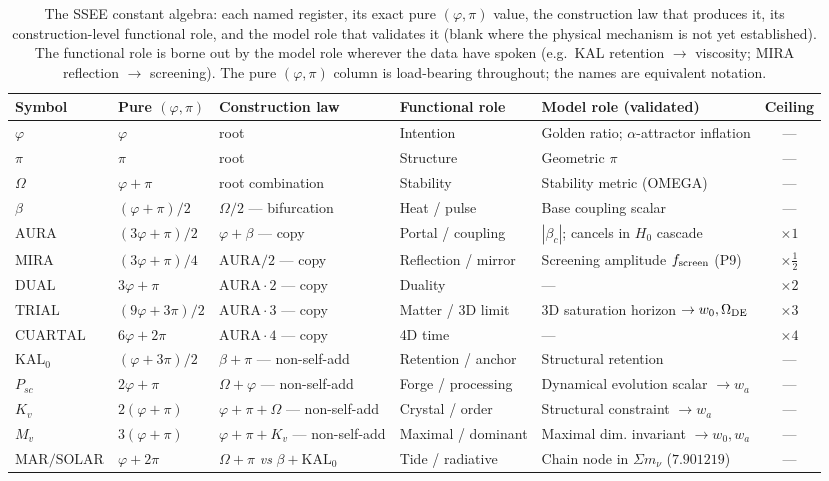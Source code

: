 \documentclass[12pt,a4paper]{article}
\begin{document}
\begin{table}[H]
\centering
\caption{The SSEE constant algebra: each named register, its exact pure
  $(\varphi,\pi)$ value, the construction law that produces it, its
  construction-level functional role, and the model role that validates it
  (blank where the physical mechanism is not yet established). The functional
  role is borne out by the model role wherever the data have spoken
  (e.g.\ KAL retention $\to$ viscosity; MIRA reflection $\to$ screening). The
  pure $(\varphi,\pi)$ column is load-bearing throughout; the names are
  equivalent notation.}
\label{tab:lineage}
\footnotesize
\setlength{\tabcolsep}{4pt}
\renewcommand{\arraystretch}{1.25}
\begin{tabularx}{\textwidth}{l p{1.9cm} p{2.5cm} p{1.9cm} X c}
\toprule
Symbol & Pure $(\varphi,\pi)$ & Construction law & Functional role & Model role (validated) & Ceiling \\
\midrule
$\varphi$ & $\varphi$ & root & Intention & Golden ratio; $\alpha$-attractor inflation & — \\
$\pi$ & $\pi$ & root & Structure & Geometric $\pi$ & — \\
$\Omega$ & $\varphi+\pi$ & root combination & Stability & Stability metric (OMEGA) & — \\
$\beta$ & $(\varphi+\pi)/2$ & $\Omega/2$ — bifurcation & Heat / pulse & Base coupling scalar & — \\
$\mathrm{AURA}$ & $(3\varphi+\pi)/2$ & $\varphi+\beta$ — copy & Portal / coupling & $|\beta_c|$; cancels in $H_0$ cascade & $\times1$ \\
$\mathrm{MIRA}$ & $(3\varphi+\pi)/4$ & $\mathrm{AURA}/2$ — copy & Reflection / mirror & Screening amplitude $f_{\rm screen}$ (P9) & $\times\tfrac12$ \\
$\mathrm{DUAL}$ & $3\varphi+\pi$ & $\mathrm{AURA}\cdot2$ — copy & Duality & — & $\times2$ \\
$\mathrm{TRIAL}$ & $(9\varphi+3\pi)/2$ & $\mathrm{AURA}\cdot3$ — copy & Matter / 3D limit & 3D saturation horizon $\to w_0,\Omega_{\rm DE}$ & $\times3$ \\
$\mathrm{CUARTAL}$ & $6\varphi+2\pi$ & $\mathrm{AURA}\cdot4$ — copy & 4D time & — & $\times4$ \\
$\mathrm{KAL}_0$ & $(\varphi+3\pi)/2$ & $\beta+\pi$ — non-self-add & Retention / anchor & Structural retention & — \\
$P_{sc}$ & $2\varphi+\pi$ & $\Omega+\varphi$ — non-self-add & Forge / processing & Dynamical evolution scalar $\to w_a$ & — \\
$K_v$ & $2(\varphi+\pi)$ & $\varphi+\pi+\Omega$ — non-self-add & Crystal / order & Structural constraint $\to w_a$ & — \\
$M_v$ & $3(\varphi+\pi)$ & $\varphi+\pi+K_v$ — non-self-add & Maximal / dominant & Maximal dim. invariant $\to w_0,w_a$ & — \\
$\mathrm{MAR}/\mathrm{SOLAR}$ & $\varphi+2\pi$ & $\Omega+\pi$ \emph{vs} $\beta+\mathrm{KAL}_0$ & Tide / radiative & Chain node in $\Sigma m_\nu$ ($7.901219$) & — \\
\bottomrule
\end{tabularx}
\end{table}
\end{document}
